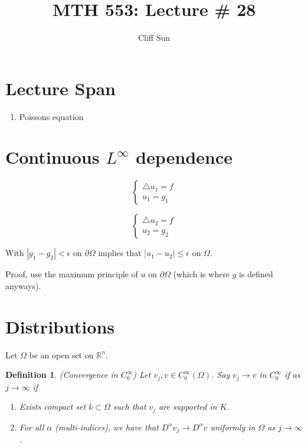 \documentclass{article}
\title{MTH 553: Lecture \# 28}
\author{Cliff Sun}
\newtheorem{definition}[theorem]{Definition}
\newtheorem{one minute paper}[theorem]{One Minute Paper}
\begin{document}
\maketitle

\section*{Lecture Span}
\begin{enumerate}
    \item Poissons equation
\end{enumerate}

\section*{Continuous $L^{\infty}$ dependence}

\begin{equation}
    \begin{cases}
        \triangle u_1 = f \\
        u_1 = g_1
    \end{cases}
\end{equation}

\begin{equation}
    \begin{cases}
        \triangle u_2 = f \\
        u_2 = g_2
    \end{cases}
\end{equation}

With $|g_1 - g_2| < \epsilon$ on $\partial \Omega$ implies that $|u_1 - u_2| \leq \epsilon$ on $\Omega$. 

Proof, use the maximum principle of $u$ on $\partial \Omega$ (which is where $g$ is defined anyways). 

\section*{Distributions}

Let $\Omega$ be an open set on $\mathbb{R}^n$. 

\begin{definition}
   (Convergence in $C_0^{\infty}$) Let $v_{j}, v \in C_{0}^{\infty}(\Omega)$. Say $v_j \rightarrow v$ in $C_0^{\infty}$ if 
   as $j \rightarrow \infty$ if 
   \begin{enumerate}
    \item Exists compact set $k \subset \Omega$ such that $v_j$ are supported in $K$. 
    \item For all $\alpha$ (multi-indices), we have that $D^{\alpha}v_j \rightarrow D^{\alpha}v$ uniformly in $\Omega$ as $j \rightarrow \infty$.
   \end{enumerate}
\end{definition}
\end{document}
